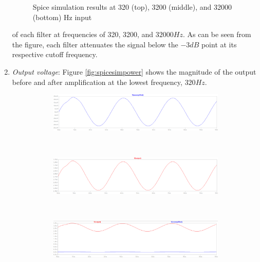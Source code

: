 \documentclass[notitlepage, 12pt]{report}
\begin{document}
\begin{enumerate}
\begin{figure}
        \caption{Spice simulation results at 320 (top), 3200 (middle), and 32000 (bottom) Hz input}
        \label{fig:spicesimresultsfreq}
    \end{figure}
    of each filter at frequencies of 320, 3200, and $32000Hz$. As can be seen from 
    the figure, each filter attenuates the signal below the $-3dB$ point at 
    its respective cutoff frequency. 
    \item \emph{Output voltage}: Figure \ref{fig:spicesimpower} shows the magnitude 
    of the output before and after amplification at the lowest frequency, $320 Hz$. 
    \begin{figure}    
        \begin{subfigure}{0.3\textwidth}
            \includegraphics[scale=0.5]{images/spiceunamplified.png}
        \end{subfigure}\\
            \begin{subfigure}{0.3\textwidth}
            \includegraphics[scale=0.5]{images/spiceamplified.png}
        \end{subfigure}\\
        \begin{subfigure}{0.3\textwidth}
            \includegraphics[scale=0.5]{images/spiceamplifiedandunamplified.png}
        \end{subfigure}    
    

\end{figure}
\end{enumerate}
\end{document}
